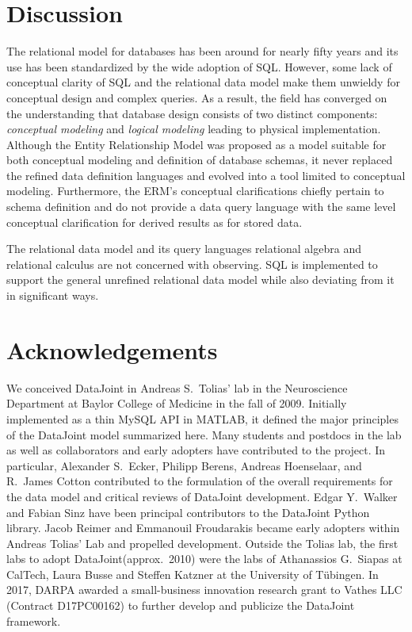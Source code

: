 \documentclass[letter,10pt]{article}
\newcommand{\datajoint}{DataJoint\xspace}
\begin{document}
\section{Discussion}
The relational model for databases has been around for nearly fifty years and its use has been standardized by the wide adoption of SQL.
However, some lack of conceptual clarity of SQL and the relational data model make them unwieldy for conceptual design and complex queries.
As a result, the field has converged on the understanding that database design consists of two distinct components: \emph{conceptual modeling} and \emph{logical modeling} leading to physical implementation. 
Although the Entity Relationship Model was proposed as a model suitable for both conceptual modeling and definition of database schemas, it never replaced the refined data definition languages and evolved into a tool limited to conceptual modeling.  
Furthermore, the ERM's conceptual clarifications chiefly pertain to schema definition and do not provide a data query language with the same level conceptual clarification for derived results as for stored data.

The relational data model and its query languages relational algebra and relational calculus are not concerned with observing. 
SQL is implemented to support the general unrefined relational data model while also deviating from it in significant ways. 

\section{Acknowledgements}
We conceived \datajoint in Andreas S.\ Tolias' lab in the Neuroscience Department at Baylor College of Medicine in the fall of 2009. 
Initially implemented as a thin MySQL API in MATLAB, it defined the major principles of the \datajoint model summarized here. 
Many students and postdocs in the lab as well as collaborators and early adopters have contributed to the project.
In particular, Alexander S.\ Ecker, Philipp Berens, Andreas Hoenselaar, and R.\ James Cotton contributed to the formulation of the overall requirements for the data model and critical reviews of \datajoint development.
Edgar Y.\ Walker and Fabian Sinz have been principal contributors to the \datajoint Python library. 
Jacob Reimer and Emmanouil Froudarakis became early adopters within Andreas Tolias' Lab and propelled development.
Outside the Tolias lab, the first labs to adopt \datajoint (approx.\ 2010) were the labs of Athanassios G.\ Siapas at CalTech, Laura Busse and Steffen Katzner at the University of T\"ubingen.
In 2017, DARPA awarded a small-business innovation research grant to Vathes LLC (Contract D17PC00162) to further develop and publicize the \datajoint framework. 






\end{document}
